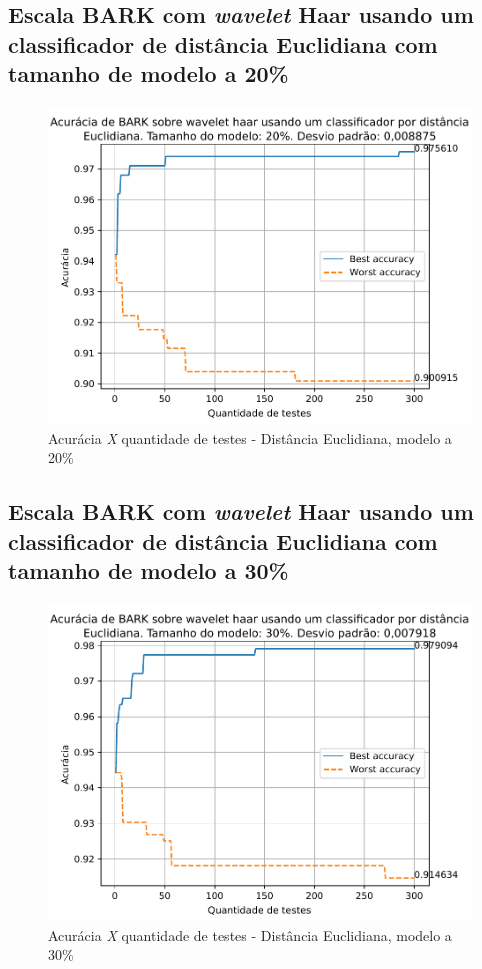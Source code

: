 		\newpage
		\subsection{Escala BARK com \textit{wavelet} Haar usando um classificador de distância Euclidiana com tamanho de modelo a 20\%}
			\begin{figure}[ht]
				\centering
				\includegraphics{images/results/confusionMatrices/classifier_Euclidian_20}
				\caption{Acurácia \textit{X} quantidade de testes - Distância Euclidiana, modelo a 20\%}
				\label{fig:classifiereuclidian20}
			\end{figure}
			
	
		\newpage
		\subsection{Escala BARK com \textit{wavelet} Haar usando um classificador de distância Euclidiana com tamanho de modelo a 30\%}
			\begin{figure}[ht]
				\centering
				\includegraphics{images/results/confusionMatrices/classifier_Euclidian_30}
				\caption{Acurácia \textit{X} quantidade de testes - Distância Euclidiana, modelo a 30\%}
				\label{fig:classifiereuclidian30}
			\end{figure}
			
	
